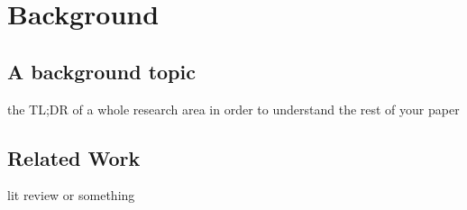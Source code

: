 \chapter{Background}\label{ch:background}
\section{A background topic}
the TL;DR of a whole research area in order to understand the rest of your paper

\section{Related Work}
lit review or something